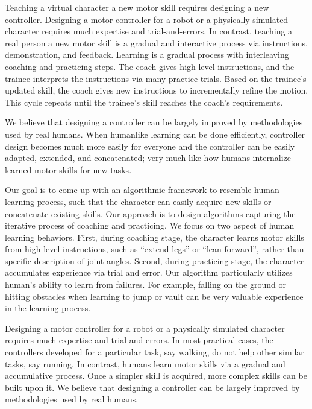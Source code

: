 Teaching a virtual character a new motor skill requires designing a
new controller. 
Designing a motor controller for a robot or a physically simulated
character requires much expertise and trial-and-errors. 
In contrast, teaching a real person a new motor skill
is a gradual and interactive process via instructions, demonstration,
and feedback.
Learning is a gradual process with interleaving coaching and practicing steps. The coach gives high-level instructions, and the trainee interprets the instructions via many practice trials. Based on the trainee's updated skill, the coach gives new instructions to incrementally refine the motion. This cycle repeats until the trainee's skill reaches the coach's requirements.

We believe that designing a controller can be largely improved by
methodologies used by real humans. 
When humanlike learning can be done efficiently, controller design
becomes much more easily for everyone and the controller can be easily
adapted, extended, and concatenated; very much like how humans
internalize learned motor skills for new tasks.

Our goal is to come up with an algorithmic framework to resemble human
learning process, such that the character can easily acquire new
skills or concatenate existing skills. Our approach is to design
algorithms capturing the iterative process of coaching and
practicing. We focus on two aspect of human learning behaviors. First,
during coaching stage, the character learns motor skills from
high-level instructions, such as ``extend legs'' or ``lean forward'',
rather than specific description of joint angles. Second, during
practicing stage, the character accumulates experience via trial and
error. Our algorithm particularly utilizes human's ability to learn
from failures. For example, falling on the ground or hitting obstacles
when learning to jump or vault can be very valuable experience in the
learning process.




Designing a motor controller for a robot or a physically simulated
character requires much expertise and trial-and-errors. In most
practical cases, the controllers developed for a particular task, say
walking, do not help other similar tasks, say running. In contrast,
humans learn motor skills via a gradual and accumulative process. Once
a simpler skill is acquired, more complex skills can be built upon
it. 
We believe that designing a controller can be largely improved by
methodologies used by real humans. 

